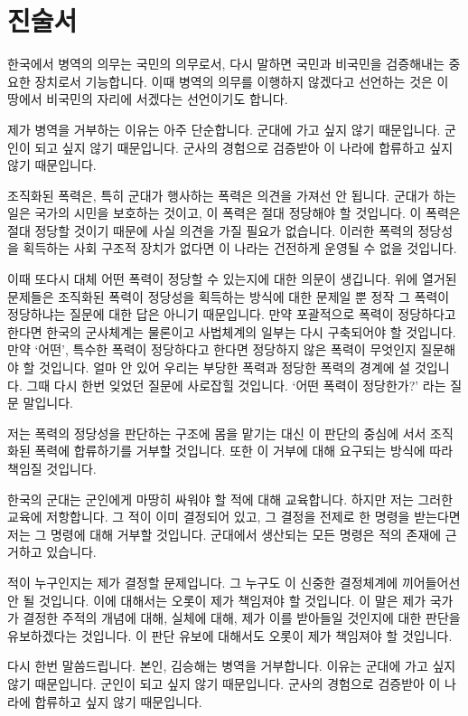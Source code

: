 \begin{article}
\hypertarget{uxc9c4uxc220uxc11c}{%
\chapter{진술서}\label{uxc9c4uxc220uxc11c}}

한국에서 병역의 의무는 국민의 의무로서, 다시 말하면 국민과 비국민을 검증해내는 중요한 장치로서 기능합니다. 이때 병역의 의무를 이행하지 않겠다고 선언하는 것은 이 땅에서 비국민의 자리에 서겠다는 선언이기도 합니다.

제가 병역을 거부하는 이유는 아주 단순합니다. 군대에 가고 싶지 않기 때문입니다. 군인이 되고 싶지 않기 때문입니다. 군사의 경험으로 검증받아 이 나라에 합류하고 싶지 않기 때문입니다.

조직화된 폭력은, 특히 군대가 행사하는 폭력은 의견을 가져선 안 됩니다. 군대가 하는 일은 국가의 시민을 보호하는 것이고, 이 폭력은 절대 정당해야 할 것입니다. 이 폭력은 절대 정당할 것이기 때문에 사실 의견을 가질 필요가 없습니다. 이러한 폭력의 정당성을 획득하는 사회 구조적 장치가 없다면 이 나라는 건전하게 운영될 수 없을 것입니다.

이때 또다시 대체 어떤 폭력이 정당할 수 있는지에 대한 의문이 생깁니다. 위에 열거된 문제들은 조직화된 폭력이 정당성을 획득하는 방식에 대한 문제일 뿐 정작 그 폭력이 정당하냐는 질문에 대한 답은 아니기 때문입니다. 만약 포괄적으로 폭력이 정당하다고 한다면 한국의 군사체계는 물론이고 사법체계의 일부는 다시 구축되어야 할 것입니다. 만약 `어떤', 특수한 폭력이 정당하다고 한다면 정당하지 않은 폭력이 무엇인지 질문해야 할 것입니다. 얼마 안 있어 우리는 부당한 폭력과 정당한 폭력의 경계에 설 것입니다. 그때 다시 한번 잊었던 질문에 사로잡힐 것입니다. `어떤 폭력이 정당한가?' 라는 질문 말입니다.

저는 폭력의 정당성을 판단하는 구조에 몸을 맡기는 대신 이 판단의 중심에 서서 조직화된 폭력에 합류하기를 거부할 것입니다. 또한 이 거부에 대해 요구되는 방식에 따라 책임질 것입니다.

한국의 군대는 군인에게 마땅히 싸워야 할 적에 대해 교육합니다. 하지만 저는 그러한 교육에 저항합니다. 그 적이 이미 결정되어 있고, 그 결정을 전제로 한 명령을 받는다면 저는 그 명령에 대해 거부할 것입니다. 군대에서 생산되는 모든 명령은 적의 존재에 근거하고 있습니다.

적이 누구인지는 제가 결정할 문제입니다. 그 누구도 이 신중한 결정체계에 끼어들어선 안 될 것입니다. 이에 대해서는 오롯이 제가 책임져야 할 것입니다. 이 말은 제가 국가가 결정한 주적의 개념에 대해, 실체에 대해, 제가 이를 받아들일 것인지에 대한 판단을 유보하겠다는 것입니다. 이 판단 유보에 대해서도 오롯이 제가 책임져야 할 것입니다.

다시 한번 말씀드립니다. 본인, 김승해는 병역을 거부합니다. 이유는 군대에 가고 싶지 않기 때문입니다. 군인이 되고 싶지 않기 때문입니다. 군사의 경험으로 검증받아 이 나라에 합류하고 싶지 않기 때문입니다.
\end{article}

